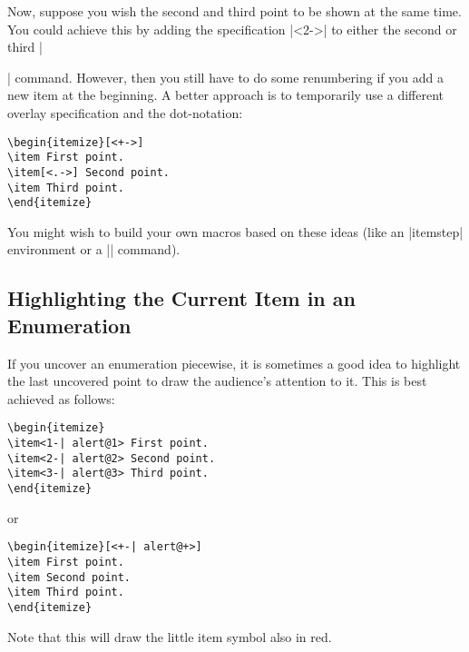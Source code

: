 Now, suppose you wish the second and third point to be shown at the
same time. You could achieve this by adding the specification |<2->|
to either the second or third |\item| command. However, then you still
have to do some renumbering if you add a new item at the beginning. A
better approach is to temporarily use a different overlay
specification and the dot-notation:

\begin{verbatim}
\begin{itemize}[<+->]
\item First point.
\item[<.->] Second point.
\item Third point.
\end{itemize}
\end{verbatim}

You might wish to build your own macros based on these ideas (like an
|itemstep| environment or a |\itemlikeprevious| command).



\subsection{Highlighting the Current Item in an Enumeration}

If you uncover an enumeration piecewise, it is sometimes a good idea
to highlight the last uncovered point to draw the audience's attention
to it. This is best achieved as follows:


\begin{verbatim}
\begin{itemize}
\item<1-| alert@1> First point.
\item<2-| alert@2> Second point.
\item<3-| alert@3> Third point.
\end{itemize}
\end{verbatim}

or

\begin{verbatim}
\begin{itemize}[<+-| alert@+>]
\item First point.
\item Second point.
\item Third point.
\end{itemize}
\end{verbatim}

Note that this will draw the little item symbol also in red.



